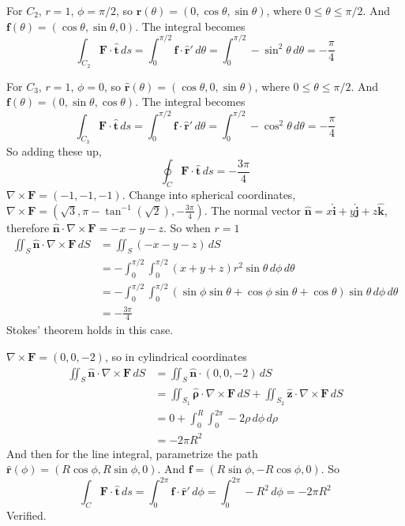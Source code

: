 \documentclass{article}
\begin{document}
\begin{homeworkProblem}
\begin{enumerate}[label=(\alph*)]
\begin{item}
			For $C_2$, $r=1$, $\phi=\pi/2$, so $\hat{\mathbf{r}}(\theta)=(0,\cos\theta,\sin\theta)$, where $0\leq\theta\leq\pi/2$. And $\mathbf{f}(\theta)=(\cos\theta,\sin\theta,0)$. The integral becomes
			\[
				\int_{C_2}\mathbf{F}\cdot\hat{\mathbf{t}}\,ds=\int_0^{\pi/2}\mathbf{f}\cdot\hat{\mathbf{r}}'\,d\theta=\int_0^{\pi/2}-\sin^2\theta\,d\theta=-\frac{\pi}{4}
			\]

			For $C_3$, $r=1$, $\phi=0$, so $\hat{\mathbf{r}}(\theta)=(\cos\theta,0,\sin\theta)$, where $0\leq\theta\leq\pi/2$. And $\mathbf{f}(\theta)=(0,\sin\theta,\cos\theta)$. The integral becomes
			\[
				\int_{C_3}\mathbf{F}\cdot\hat{\mathbf{t}}\,ds=\int_0^{\pi/2}\mathbf{f}\cdot\hat{\mathbf{r}}'\,d\theta=\int_0^{\pi/2}-\cos^2\theta\,d\theta=-\frac{\pi}{4}
			\]
			So adding these up,
			\[
				\oint_C\mathbf{F}\cdot\hat{\mathbf{t}}\,ds=-\frac{3\pi}{4}
			\]
			$\nabla\times\mathbf{F}=(-1,-1,-1)$. Change into spherical coordinates, $\nabla\times\mathbf{F}=\left(\sqrt{3},\pi-\tan^{-1}\left(\sqrt{2}\right),-\frac{3\pi}{4}\right)$. The normal vector $\hat{\mathbf{n}}=x\hat{\mathbf{i}}+y\hat{\mathbf{j}}+z\hat{\mathbf{k}}$, therefore $\hat{\mathbf{n}}\cdot\nabla\times\mathbf{F}=-x-y-z$. So when $r=1$
			\begin{align*}
				\iint_S\hat{\mathbf{n}}\cdot\nabla\times\mathbf{F}\,dS&=\iint_S(-x-y-z)\,dS \\
				&=-\int_0^{\pi/2}\int_0^{\pi/2}(x+y+z)r^2\sin\theta\,d\phi\,d\theta \\
				&=-\int_0^{\pi/2}\int_0^{\pi/2}(\sin\phi\sin\theta+\cos\phi\sin\theta+\cos\theta)\sin\theta\,d\phi\,d\theta \\
				&=-\frac{3\pi}{4}
			\end{align*}
			Stokes' theorem holds in this case.
		\end{item}
		\begin{item}
			$\nabla\times\mathbf{F}=(0,0,-2)$, so in cylindrical coordinates
			\begin{align*}
				\iint_S\hat{\mathbf{n}}\cdot\nabla\times\mathbf{F}\,dS&=\iint_S\hat{\mathbf{n}}\cdot(0,0,-2)\,dS \\
				&=\iint_{S_1}\hat{\mathbf{\rho}}\cdot\nabla\times\mathbf{F}\,dS+\iint_{S_2}\hat{\mathbf{z}}\cdot\nabla\times\mathbf{F}\,dS \\
				&=0+\int_0^R\int_0^{2\pi}-2\rho\,d\phi\,d\rho \\
				&=-2\pi R^2
			\end{align*}
			And then for the line integral, parametrize the path $\hat{\mathbf{r}}(\phi)=(R\cos\phi,R\sin\phi,0)$. And $\mathbf{f}=(R\sin\phi,-R\cos\phi,0)$. So
			\[
				\int_C\mathbf{F}\cdot\hat{\mathbf{t}}\,ds=\int_0^{2\pi}\mathbf{f}\cdot\hat{\mathbf{r}}'\,d\phi=\int_0^{2\pi}-R^2\,d\phi=-2\pi R^2
			\]
			Verified.
		\end{item}
	\end{enumerate}
\end{homeworkProblem}
\end{document}
